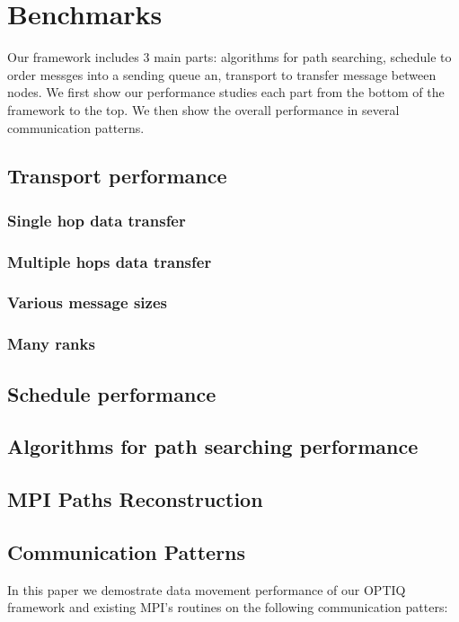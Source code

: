 \section{Benchmarks}
\label{sec:benchmark}

Our framework includes 3 main parts: algorithms for path searching, schedule to order messges into a sending queue an, transport to transfer message between nodes. We first show our performance studies each part from the bottom of the framework to the top. We then show the overall performance in several communication patterns.

\subsection{Transport performance}

\subsubsection{Single hop data transfer}

\subsubsection{Multiple hops data transfer}

\subsubsection{Various message sizes}

\subsubsection{Many ranks}

\subsection{Schedule performance}

\subsection{Algorithms for path searching performance }

\subsection{MPI Paths Reconstruction}

\subsection{Communication Patterns}
In this paper we demostrate data movement performance of our OPTIQ framework and existing MPI's routines on the following communication patters:

